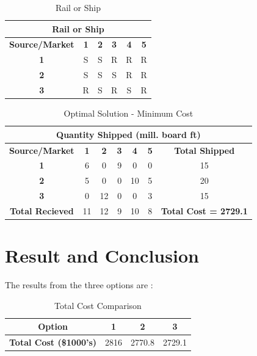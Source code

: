 \documentclass[12pt]{article}
\numberwithin{equation}{section}
\numberwithin{table}{section}
\numberwithin{figure}{section}
\begin{document}
\begin{table}[h!]
\centering
\caption{Rail or Ship}
\label{ros}
\begin{tabular}{|c|c|c|c|c|c|}
\hline
\multicolumn{6}{|c|}{\textbf{Rail or Ship}}                                             \\ \hline
\textbf{Source/Market} & \textbf{1} & \textbf{2} & \textbf{3} & \textbf{4} & \textbf{5} \\ \hline
\textbf{1}             & S          & S          & R          & R          & R          \\ \hline
\textbf{2}             & S          & S          & S          & R          & R          \\ \hline
\textbf{3}             & R          & S          & R          & S          & R          \\ \hline
\end{tabular}
\end{table}

\begin{table}[h!]
\centering
\caption{Optimal Solution - Minimum Cost}
\label{optimal_min}
\begin{tabular}{|c|c|c|c|c|c|c}
\hline
\multicolumn{7}{|c|}{\textbf{Quantity Shipped (mill. board ft)}}                                                                       \\ \hline
\textbf{Source/Market}  & \textbf{1} & \textbf{2} & \textbf{3} & \textbf{4} & \textbf{5} & \multicolumn{1}{c|}{\textbf{Total Shipped}} \\ \hline
\textbf{1}              & 6          & 0          & 9          & 0          & 0          & \multicolumn{1}{c|}{15}                     \\ \hline
\textbf{2}              & 5          & 0          & 0          & 10         & 5          & \multicolumn{1}{c|}{20}                     \\ \hline
\textbf{3}              & 0          & 12         & 0          & 0          & 3          & \multicolumn{1}{c|}{15}                     \\ \hline
\textbf{Total Recieved} & 11         & 12         & 9          & 10         & 8          & \textbf{Total Cost = 2729.1}                \\ \cline{1-6}
\end{tabular}
\end{table}

\section{Result and Conclusion}
The results from the three options are :
\begin{table}[h!]
\centering
\caption{Total Cost Comparison}
\label{tcc}
\begin{tabular}{|c|c|c|c|}
\hline
\textbf{Option}                & \textbf{1} & \textbf{2} & \textbf{3} \\ \hline
\textbf{Total Cost (\$1000's)} & 2816       & 2770.8     & 2729.1     \\ \hline
\end{tabular}
\end{table}
\end{document}
